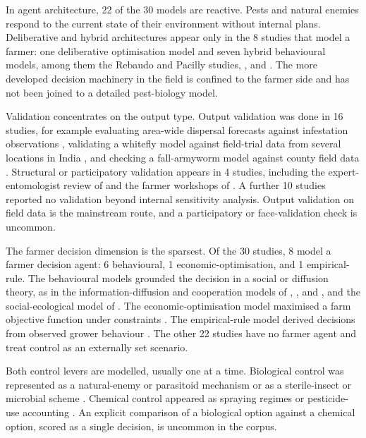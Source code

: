 In agent architecture, 22 of the 30 models are reactive. Pests and natural enemies respond to the current state of their environment without internal plans. Deliberative and hybrid architectures appear only in the 8 studies that model a farmer: one deliberative optimisation model \citep{Grovermann2017} and seven hybrid behavioural models, among them the Rebaudo and Pacilly studies, \citet{Bourceret2024}, and \citet{Chen2024}. The more developed decision machinery in the field is confined to the farmer side and has not been joined to a detailed pest-biology model.

Validation concentrates on the output type. Output validation was done in 16 studies, for example evaluating area-wide dispersal forecasts against infestation observations \citep{Koralewski2022}, validating a whitefly model against field-trial data from several locations in India \citep{Gergs2026}, and checking a fall-armyworm model against county field data \citep{Garcia2019}. Structural or participatory validation appears in 4 studies, including the expert-entomologist review of \citet{Potgieter2025} and the farmer workshops of \citet{Pacilly2019b}. A further 10 studies reported no validation beyond internal sensitivity analysis. Output validation on field data is the mainstream route, and a participatory or face-validation check is uncommon.

The farmer decision dimension is the sparsest. Of the 30 studies, 8 model a farmer decision agent: 6 behavioural, 1 economic-optimisation, and 1 empirical-rule. The behavioural models grounded the decision in a social or diffusion theory, as in the information-diffusion and cooperation models of \citet{Rebaudo2011}, \citet{RebaudoDangles2011}, and \citet{Rebaudo2013}, and the social-ecological model of \citet{Pacilly2019a}. The economic-optimisation model maximised a farm objective function under constraints \citep{Grovermann2017}. The empirical-rule model derived decisions from observed grower behaviour \citep{Chen2024}. The other 22 studies have no farmer agent and treat control as an externally set scenario.

Both control levers are modelled, usually one at a time. Biological control was represented as a natural-enemy or parasitoid mechanism \citep{vanRoermund1997,Collard2018,Delattre2019} or as a sterile-insect or microbial scheme \citep{Diouf2022,Herbillon2024}. Chemical control appeared as spraying regimes or pesticide-use accounting \citep{Grovermann2017}. An explicit comparison of a biological option against a chemical option, scored as a single decision, is uncommon in the corpus.

